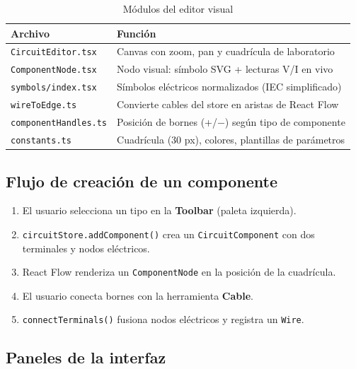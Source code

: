 \documentclass[12pt,a4paper]{article}
\begin{document}
\begin{table}[H]
  \centering
  \small
  \begin{tabularx}{\textwidth}{lX}
    \toprule
    \textbf{Archivo} & \textbf{Función} \\
    \midrule
    \texttt{CircuitEditor.tsx} & Canvas con zoom, pan y cuadrícula de laboratorio \\
    \texttt{ComponentNode.tsx} & Nodo visual: símbolo SVG + lecturas V/I en vivo \\
    \texttt{symbols/index.tsx} & Símbolos eléctricos normalizados (IEC simplificado) \\
    \texttt{wireToEdge.ts} & Convierte cables del store en aristas de React Flow \\
    \texttt{componentHandles.ts} & Posición de bornes (+/−) según tipo de componente \\
    \texttt{constants.ts} & Cuadrícula (30 px), colores, plantillas de parámetros \\
    \bottomrule
  \end{tabularx}
  \caption{Módulos del editor visual}
\end{table}

\subsection{Flujo de creación de un componente}

\begin{enumerate}[label=\arabic*.]
  \item El usuario selecciona un tipo en la \textbf{Toolbar} (paleta izquierda).
  \item \texttt{circuitStore.addComponent()} crea un \texttt{CircuitComponent} con dos terminales y nodos eléctricos.
  \item React Flow renderiza un \texttt{ComponentNode} en la posición de la cuadrícula.
  \item El usuario conecta bornes con la herramienta \textbf{Cable}.
  \item \texttt{connectTerminals()} fusiona nodos eléctricos y registra un \texttt{Wire}.
\end{enumerate}

\subsection{Paneles de la interfaz}
\end{document}
